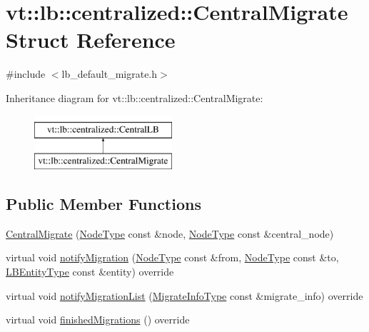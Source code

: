 \hypertarget{structvt_1_1lb_1_1centralized_1_1_central_migrate}{}\section{vt\+:\+:lb\+:\+:centralized\+:\+:Central\+Migrate Struct Reference}
\label{structvt_1_1lb_1_1centralized_1_1_central_migrate}


{\ttfamily \#include $<$lb\+\_\+default\+\_\+migrate.\+h$>$}

Inheritance diagram for vt\+:\+:lb\+:\+:centralized\+:\+:Central\+Migrate\+:\begin{figure}[H]
\begin{center}
\leavevmode
\includegraphics[height=2.000000cm]{structvt_1_1lb_1_1centralized_1_1_central_migrate}
\end{center}
\end{figure}
\subsection*{Public Member Functions}
\begin{DoxyCompactItemize}
\item 
\hyperlink{structvt_1_1lb_1_1centralized_1_1_central_migrate_a29ed99ed374932cc6340611b3c7b34d7}{Central\+Migrate} (\hyperlink{namespacevt_a866da9d0efc19c0a1ce79e9e492f47e2}{Node\+Type} const \&node, \hyperlink{namespacevt_a866da9d0efc19c0a1ce79e9e492f47e2}{Node\+Type} const \&central\+\_\+node)
\item 
virtual void \hyperlink{structvt_1_1lb_1_1centralized_1_1_central_migrate_a0800d9661c46ca7870d6045be68ddcd7}{notify\+Migration} (\hyperlink{namespacevt_a866da9d0efc19c0a1ce79e9e492f47e2}{Node\+Type} const \&from, \hyperlink{namespacevt_a866da9d0efc19c0a1ce79e9e492f47e2}{Node\+Type} const \&to, \hyperlink{namespacevt_a92ec26fb6644cd0ba7eb0ee70c96bee5}{L\+B\+Entity\+Type} const \&entity) override
\item 
virtual void \hyperlink{structvt_1_1lb_1_1centralized_1_1_central_migrate_a53c5eb03e2f6af93f207093683bbbd17}{notify\+Migration\+List} (\hyperlink{structvt_1_1lb_1_1centralized_1_1_central_l_b_a8d393c0126180fb8cce2b881c23df44f}{Migrate\+Info\+Type} const \&migrate\+\_\+info) override
\item 
virtual void \hyperlink{structvt_1_1lb_1_1centralized_1_1_central_migrate_a61e43342afb57a3f15bf8889244250d2}{finished\+Migrations} () override
\end{DoxyCompactItemize}
